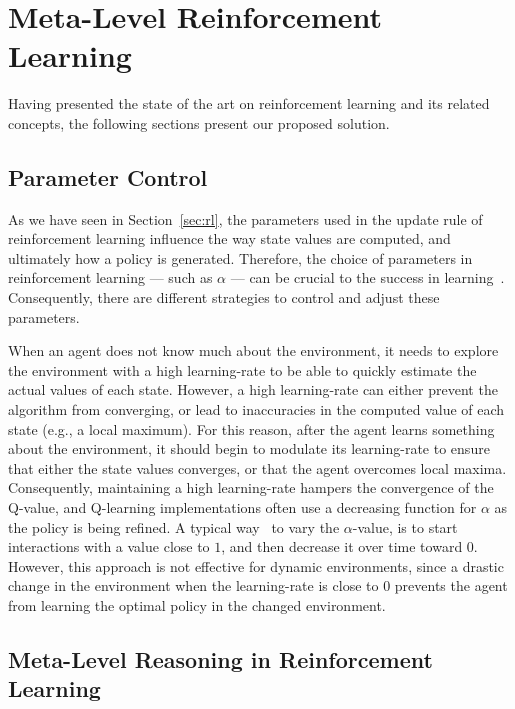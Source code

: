 \chapter{Meta-Level Reinforcement Learning}
\label{chapter:meta-rl}
Having presented the state of the art on reinforcement learning and its related concepts,
the following sections present our proposed solution.


\section{Parameter Control}
\label{sec:parameter-control}

As we have seen in Section~\ref{sec:rl}, the parameters used in the update rule of reinforcement learning influence the way state values are computed, and ultimately how a policy is generated. 
Therefore, the choice of parameters in reinforcement learning
--- such as $\alpha$ ---
can be crucial to the success in learning~\cite{schweighofer2003meta}. 
Consequently, there are different strategies to control and adjust these parameters. 

When an agent does not know much about the environment, it needs to explore the environment with a high learning-rate to be able to quickly estimate the actual values of each state. 
However, a high learning-rate can either prevent the algorithm from converging, or lead to inaccuracies in the computed value of each state (e.g., a local maximum). 
For this reason, after the agent learns something about the environment, it should begin to modulate its learning-rate to ensure that either the state values converges, or that the agent overcomes local maxima. 
% 
Consequently, maintaining a high learning-rate hampers the convergence of the Q-value, and Q-learning implementations often use a decreasing function for $\alpha$ as the policy is being refined. 
A typical way~\cite{schweighofer2003meta} to vary the $\alpha$-value, is to start interactions with a value close to $1$, and then decrease it over time toward $0$.
However, this approach is not effective for dynamic environments, since a drastic change in the environment when the learning-rate is close to $0$ prevents the agent from learning the optimal policy in the changed environment. 



\section{Meta-Level Reasoning in Reinforcement Learning}
\label{sec:meta-reasoning-rl}

